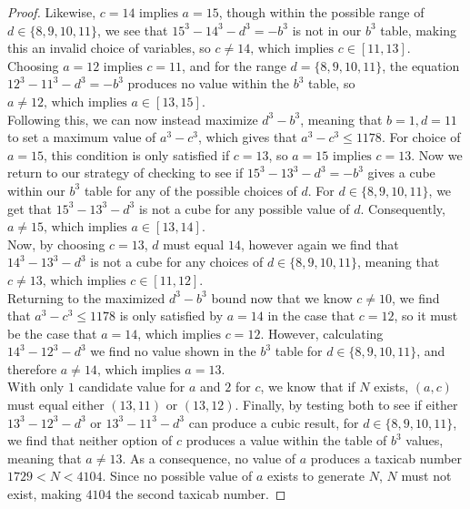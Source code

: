 \documentclass[12pt]{amsart}
\theoremstyle{definition}
\theoremstyle{remark}
\begin{document}
\begin{proof}
Likewise, $c=14 \text{ implies } a=15$, though within the possible range of $d \in \{8,9,10,11\}$, we see that $15^3-14^3-d^3=-b^3$ is not in our $b^3$ table, making this an invalid choice of variables, so $c\neq14 \text{, which implies } c\in[11,13]$.\\

Choosing $a=12 \text{ implies } c=11$, and for the range $d=\{8,9,10,11\}$, the equation $12^3-11^3-d^3=-b^3$ produces no value within the $b^3$ table, so $a\neq12 \text{, which implies }a\in[13,15]$.\\

Following this, we can now instead maximize $d^3-b^3$, meaning that $b=1,d=11$ to set a maximum value of $a^3-c^3$, which gives that $a^3-c^3 \leq 1178$. For choice of $a=15$, this condition is only satisfied if $c=13$, so $a=15 \text{ implies } c=13$. Now we return to our strategy of checking to see if $15^3-13^3-d^3=-b^3$ gives a cube within our $b^3$ table for any of the possible choices of $d$. For $d \in \{8,9,10,11\}$, we get that $15^3-13^3 - d^3$ is not a cube for any possible value of $d$. Consequently, $a\neq15 \text{, which implies } a\in[13,14]$.\\

Now, by choosing $c=13$, $d$ must equal $14$, however again we find that $14^3-13^3-d^3$ is not a cube for any choices of $d \in \{8,9,10,11\}$, meaning that $c\neq 13 \text{, which implies } c\in[11,12]$.\\

Returning to the maximized $d^3-b^3$ bound now that we know $c\neq 10$, we find that $a^3-c^3 \leq 1178$ is only satisfied by $a=14$ in the case that $c=12$, so it must be the case that $a=14 \text{, which implies } c=12$. However, calculating $14^3-12^3-d^3$ we find no value shown in the $b^3$ table for $d\in \{8,9,10,11\}$, and therefore $a\neq14 \text{, which implies } a=13$.\\

With only $1$ candidate value for $a$ and $2$ for $c$, we know that if $N$ exists, $(a,c)$ must equal either $(13,11)$ or $(13,12)$. Finally, by testing both to see if either $13^3-12^3-d^3$ or $13^3-11^3-d^3$ can produce a cubic result, for $d\in \{8,9,10,11\}$, we find that neither option of $c$ produces a value within the table of $b^3$ values, meaning that $a\neq13$. As a consequence, no value of $a$ produces a taxicab number $1729<N<4104$. Since no possible value of $a$ exists to generate $N$, $N$ must not exist, making $4104$ the second taxicab number.


\end{proof}
\end{document}
